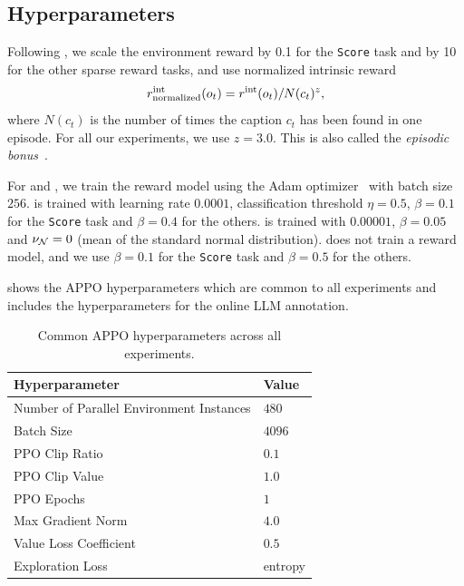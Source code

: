 \subsection{Hyperparameters}
\label{sec:rl-details}
Following \citet{klissarovdoro2023motif}, we scale the environment reward by 0.1 for the \texttt{Score} task and by 10 for the other sparse reward tasks, and use normalized intrinsic reward
\begin{equation}
    \label{eq:episodic_normalization}
    r^\mathrm{int}_{\text{normalized}}(o_t) = r^\mathrm{int}(o_t) / N(c_t)^z,
\end{equation}
where $N(c_t)$ is the number of times the caption $c_t$ has been found in one episode. For all our experiments, we use $z=3.0$. This is also called the \emph{episodic bonus}~\cite{henaff2022exploration}.

For \onicls and \oniranking, we train the reward model using the Adam optimizer~\cite{kingma2014adam} with batch size $256$.
\onicls is trained with learning rate $0.0001$, classification threshold $\eta=0.5$, $\beta=0.1$ for the \texttt{Score} task and $\beta=0.4$ for the others.
\oniranking is trained with $0.00001$, $\beta=0.05$ and $\nu_{\mathcal{N}} = 0$ (mean of the standard normal distribution).
\oniretrieval does not train a reward model, and we use $\beta=0.1$ for the \texttt{Score} task and $\beta=0.5$ for the others.


 shows the APPO hyperparameters which are common to all experiments and  includes the hyperparameters for the online LLM annotation.
\begin{table}[H]
    \centering
    \begin{tabular}{ll}
    Hyperparameter & Value \\
    \midrule
    Number of Parallel Environment Instances & $480$ \\
    Batch Size & $4096$ \\
    PPO Clip Ratio & $0.1$ \\
    PPO Clip Value & $1.0$ \\
    PPO Epochs & $1$ \\
    Max Gradient Norm & $4.0$ \\
    Value Loss Coefficient & $0.5$ \\
    Exploration Loss & entropy \\
%
%
%
    \end{tabular}
    \caption{Common APPO hyperparameters across all experiments.}
    \label{tab:common-appo-hps}
\end{table}


